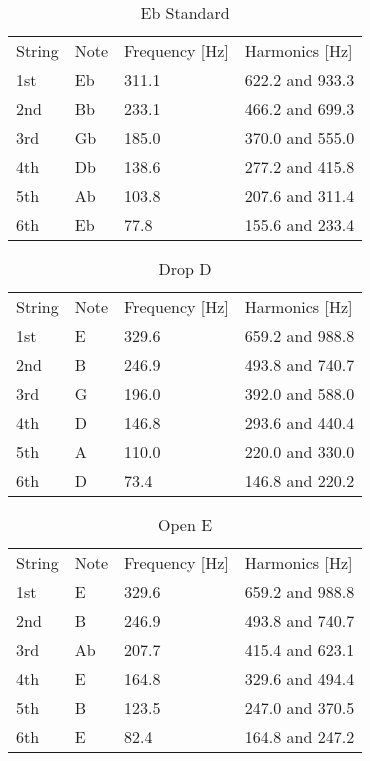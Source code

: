 \begin{table}[H]
\centering
\caption{Eb Standard}
\label{eb_tuning}
\begin{tabular}{llll}
String & Note & Frequency [Hz] & Harmonics [Hz]       \\
1st     & Eb   & 311.1     & 622.2 and 933.3 \\
2nd    & Bb   & 233.1     & 466.2 and 699.3 \\
3rd    & Gb   & 185.0     & 370.0 and 555.0 \\
4th    & Db   & 138.6     & 277.2 and 415.8 \\
5th    & Ab   & 103.8     & 207.6 and 311.4 \\
6th    & Eb   & 77.8      & 155.6 and 233.4
\end{tabular}
\end{table}

\begin{table}[H]
\centering
\caption{Drop D}
\label{drop_d}
\begin{tabular}{llll}
String & Note & Frequency [Hz] & Harmonics [Hz]       \\
1st    & E    & 329.6     & 659.2 and 988.8 \\
2nd   & B    & 246.9     & 493.8 and 740.7 \\
3rd    & G    & 196.0     & 392.0 and 588.0 \\
4th    & D    & 146.8     & 293.6 and 440.4 \\
5th    & A    & 110.0     & 220.0 and 330.0 \\
6th    & D    & 73.4      & 146.8 and 220.2
\end{tabular}
\end{table}

\begin{table}[H]
\centering
\caption{Open E}
\label{open_e}
\begin{tabular}{llll}
String & Note & Frequency [Hz] & Harmonics [Hz] \\
1st    & E    & 329.6     & 659.2 and 988.8 \\
2nd   & B   & 246.9     & 493.8 and 740.7 \\
3rd    & Ab  & 207.7     & 415.4 and 623.1 \\
4th    & E   & 164.8     & 329.6 and 494.4\\
5th    & B    & 123.5     &  247.0 and 370.5\\
6th    & E    & 82.4      & 164.8 and 247.2
\end{tabular}
\end{table}

